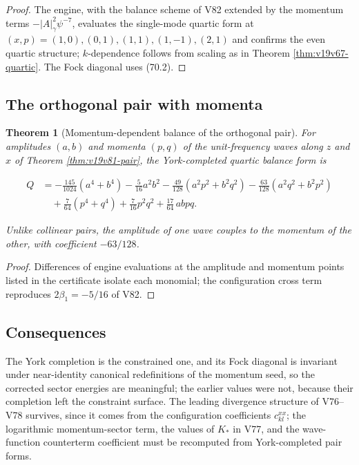 \documentclass[11pt]{article}
\newtheorem{theorem}{Theorem}[section]
\theoremstyle{remark}
\begin{document}
\begin{proof}
The engine, with the balance scheme of V82 extended by the momentum
terms \(-|A|^2_\gamma\psi^{-7}\), evaluates the single-mode quartic
form at \((x,p)=(1,0),(0,1),(1,1),(1,-1),(2,1)\) and confirms the even
quartic structure; \(k\)-dependence follows from scaling as in
Theorem \ref{thm:v19v67-quartic}.  The Fock diagonal uses (70.2).
\end{proof}

\subsection{The orthogonal pair with momenta}

\begin{theorem}[Momentum-dependent balance of the orthogonal pair]
\label{thm:v19v83-pair}
For amplitudes \((a,b)\) and momenta \((p,q)\) of the unit-frequency
waves along \(z\) and \(x\) of Theorem \ref{thm:v19v81-pair}, the
York-completed quartic balance form is

\[
\begin{aligned}
 Q&=-\frac{145}{1024}(a^4+b^4)-\frac5{16}a^2b^2
 -\frac{49}{128}(a^2p^2+b^2q^2)-\frac{63}{128}(a^2q^2+b^2p^2)\\
 &\quad+\frac7{64}(p^4+q^4)+\frac7{16}p^2q^2+\frac{17}{64}\,abpq .
\end{aligned}                                                          \tag{86.2}
\]

Unlike collinear pairs, the amplitude of one wave couples to the
momentum of the other, with coefficient \(-63/128\).
\end{theorem}

\begin{proof}
Differences of engine evaluations at the amplitude and momentum points
listed in the certificate isolate each monomial; the configuration
cross term reproduces \(2\beta_1=-5/16\) of V82.
\end{proof}

\subsection{Consequences}

The York completion is the constrained one, and its Fock diagonal is
invariant under near-identity canonical redefinitions of the momentum
seed, so the corrected sector energies are meaningful; the earlier
values were not, because their completion left the constraint surface.
The leading divergence structure of V76--V78 survives, since it comes
from the configuration coefficients \(c^{xx}_{kl}\); the logarithmic
momentum-sector term, the values of \(K_*\) in V77, and the
wave-function counterterm coefficient must be recomputed from
York-completed pair forms.
\end{document}
